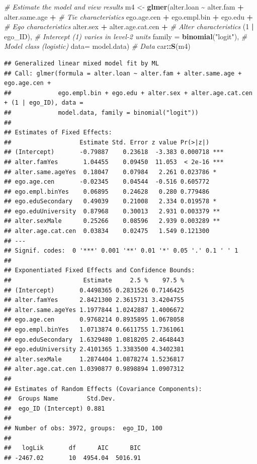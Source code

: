 \documentclass[
]{book}
\newenvironment{Shaded}{\begin{snugshade}}{\end{snugshade}}
\newcommand{\AttributeTok}[1]{\textcolor[rgb]{0.13,0.29,0.53}{#1}}
\newcommand{\CommentTok}[1]{\textcolor[rgb]{0.56,0.35,0.01}{\textit{#1}}}
\newcommand{\DecValTok}[1]{\textcolor[rgb]{0.00,0.00,0.81}{#1}}
\newcommand{\FunctionTok}[1]{\textcolor[rgb]{0.13,0.29,0.53}{\textbf{#1}}}
\newcommand{\NormalTok}[1]{#1}
\newcommand{\OtherTok}[1]{\textcolor[rgb]{0.56,0.35,0.01}{#1}}
\newcommand{\SpecialCharTok}[1]{\textcolor[rgb]{0.81,0.36,0.00}{\textbf{#1}}}
\newcommand{\StringTok}[1]{\textcolor[rgb]{0.31,0.60,0.02}{#1}}
\begin{document}
\begin{Shaded}
\begin{Highlighting}[]
\CommentTok{\# Estimate the model and view results}
\NormalTok{m4 }\OtherTok{\textless{}{-}} \FunctionTok{glmer}\NormalTok{(alter.loan }\SpecialCharTok{\textasciitilde{}}\NormalTok{ alter.fam }\SpecialCharTok{+}\NormalTok{ alter.same.age }\SpecialCharTok{+} \CommentTok{\# Tie characteristics}
\NormalTok{              ego.age.cen }\SpecialCharTok{+}\NormalTok{ ego.empl.bin }\SpecialCharTok{+}\NormalTok{ ego.edu }\SpecialCharTok{+} \CommentTok{\# Ego characteristics}
\NormalTok{              alter.sex }\SpecialCharTok{+}\NormalTok{ alter.age.cat.cen }\SpecialCharTok{+} \CommentTok{\# Alter characteristics}
\NormalTok{              (}\DecValTok{1} \SpecialCharTok{|}\NormalTok{ ego\_ID), }\CommentTok{\# Intercept (1) varies in level{-}2 units}
            \AttributeTok{family =} \FunctionTok{binomial}\NormalTok{(}\StringTok{"logit"}\NormalTok{), }\CommentTok{\# Model class (logistic)}
            \AttributeTok{data=}\NormalTok{ model.data) }\CommentTok{\# Data}
\NormalTok{car}\SpecialCharTok{::}\FunctionTok{S}\NormalTok{(m4)}
\end{Highlighting}
\end{Shaded}

\begin{verbatim}
## Generalized linear mixed model fit by ML
## Call: glmer(formula = alter.loan ~ alter.fam + alter.same.age + ego.age.cen +
##             ego.empl.bin + ego.edu + alter.sex + alter.age.cat.cen + (1 | ego_ID), data =
##             model.data, family = binomial("logit"))
## 
## Estimates of Fixed Effects:
##                   Estimate Std. Error z value Pr(>|z|)    
## (Intercept)       -0.79887    0.23618  -3.383 0.000718 ***
## alter.famYes       1.04455    0.09450  11.053  < 2e-16 ***
## alter.same.ageYes  0.18047    0.07984   2.261 0.023786 *  
## ego.age.cen       -0.02345    0.04544  -0.516 0.605772    
## ego.empl.binYes    0.06895    0.24628   0.280 0.779486    
## ego.eduSecondary   0.49039    0.21008   2.334 0.019578 *  
## ego.eduUniversity  0.87968    0.30013   2.931 0.003379 ** 
## alter.sexMale      0.25266    0.08596   2.939 0.003289 ** 
## alter.age.cat.cen  0.03834    0.02475   1.549 0.121300    
## ---
## Signif. codes:  0 '***' 0.001 '**' 0.01 '*' 0.05 '.' 0.1 ' ' 1
## 
## Exponentiated Fixed Effects and Confidence Bounds:
##                    Estimate     2.5 %    97.5 %
## (Intercept)       0.4498365 0.2831526 0.7146425
## alter.famYes      2.8421300 2.3615731 3.4204755
## alter.same.ageYes 1.1977844 1.0242887 1.4006672
## ego.age.cen       0.9768214 0.8935895 1.0678058
## ego.empl.binYes   1.0713874 0.6611755 1.7361061
## ego.eduSecondary  1.6329480 1.0818205 2.4648443
## ego.eduUniversity 2.4101365 1.3383500 4.3402381
## alter.sexMale     1.2874404 1.0878274 1.5236817
## alter.age.cat.cen 1.0390877 0.9898894 1.0907312
## 
## Estimates of Random Effects (Covariance Components):
##  Groups Name        Std.Dev.
##  ego_ID (Intercept) 0.881   
## 
## Number of obs: 3972, groups:  ego_ID, 100
## 
##   logLik       df      AIC      BIC 
## -2467.02       10  4954.04  5016.91
\end{verbatim}
\end{document}
